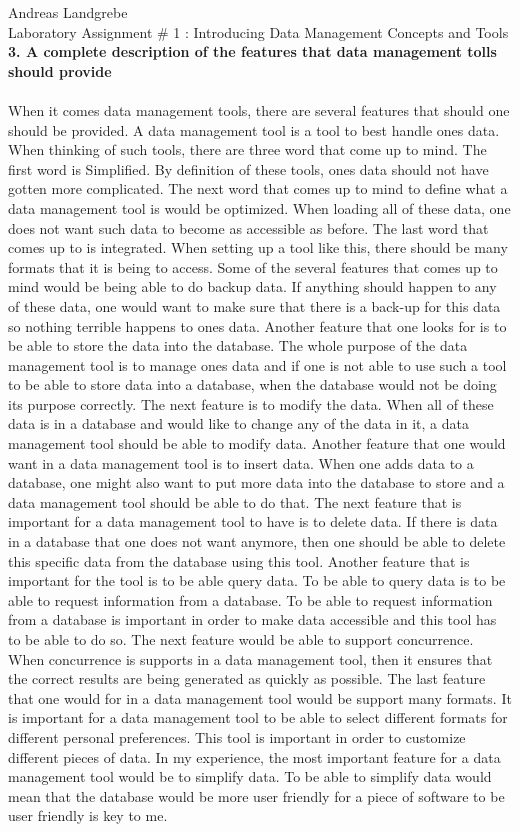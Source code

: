 \documentclass{article}
\begin{document}
\noindent
Andreas Landgrebe
\\
Laboratory Assignment \# 1 : Introducing Data Management Concepts and Tools
\\
\textbf{3. A complete description of the features that data management tolls should provide}
\\
\\
When it comes data management tools, there are several features that should one should be provided. A data management tool is a tool to best handle ones data. When thinking of such tools, there are three word that come up to mind. The first word is Simplified. By definition of these tools, ones data should not have gotten more complicated. The next word that comes up to mind to define what a data management tool is would be optimized. When loading all of these data, one does not want such data to become as accessible as before. The last word that comes up to is integrated. When setting up a tool like this, there should be many formats that it is being to access. Some of the several features that comes up to mind would be being able to do backup data. If anything should happen to any of these data, one would want to make sure that there is a back-up for this data so nothing terrible happens to ones data. Another feature that one looks for is to be able to store the data into the database. The whole purpose of the data management tool is to manage ones data and if one is not able to use such a tool to be able to store data into a database, when the database would not be doing its purpose correctly. The next feature is to modify the data. When all of these data is in a database and would like to change any of the data in it, a data management tool should be able to modify data. Another feature that one would want in a data management tool is to insert data. When one adds data to a database, one might also want to put more data into the database to store and a data management tool should be able to do that. The next feature that is important for a data management tool to have is to delete data. If there is data in a database that one does not want anymore, then one should be able to delete this specific data from the database using this tool. Another feature that is important for the tool is to be able query data. To be able to query data is to be able to request information from a database. To be able to request information from a database is important in order to make data accessible and this tool has to be able to do so. The next feature would be able to support concurrence. When concurrence is supports in a data management tool, then it ensures that the correct results are being generated as quickly as possible.
The last feature that one would for in a data management tool would be support many formats. It is important for a data management tool to be able to select different formats for different personal preferences. This tool is important in order to customize different pieces of data. In my experience, the most important feature for a data management tool would be to simplify data. To be able to simplify data would mean that the database would be more user friendly for a piece of software to be user friendly is key to me.
\end{document}
